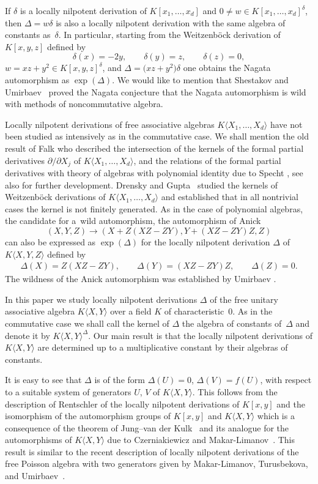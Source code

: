 \documentclass[pdftex]{sigma}
\numberwithin{equation}{section}
\begin{document}
If $\delta$ is a locally nilpotent derivation of $K[x_1,\ldots,x_d]$ and $0\not=w\in K[x_1,\ldots,x_d]^{\delta}$, then $\Delta=w\delta$ is also a locally nilpotent derivation with the same algebra of constants as~$\delta$. In particular, starting from the Weitzenb\"ock derivation of $K[x,y,z]$ defined by
\[
\delta(x)=-2y,\qquad \delta(y)=z,\qquad \delta(z)=0,
\]
$w=xz+y^2\in K[x,y,z]^{\delta}$, and $\Delta=\big(xz+y^2\big)\delta$ one obtains the Nagata automorphism as $\exp(\Delta)$. We would like to mention that Shestakov and Umirbaev~\cite{SU1, SU2} proved the Nagata conjecture that the Nagata automorphism is wild with methods of noncommutative algebra.

Locally nilpotent derivations of free associative algebras $K\langle X_1,\ldots,X_d\rangle$ have not been studied as intensively as in the commutative case. We shall mention the old result of Falk \cite{Fa} who described the intersection of the kernels of the formal partial derivatives $\partial/\partial X_j$ of $K\langle X_1,\ldots,X_d\rangle$, and the relations of the formal partial derivatives with theory of algebras with polynomial identity due to Specht \cite{Sp}, see also \cite{D1} for further development. Drensky and Gupta~\cite{DG} studied the kernels of Weitzenb\"ock derivations of $K\langle X_1,\ldots,X_d\rangle$ and established that in all nontrivial cases the kernel is not finitely generated. As in the case of polynomial algebras, the candidate for a~wild automorphism, the automorphism of Anick \cite[p.~343]{Co}
\[
(X,Y,Z)\to(X+Z(XZ-ZY),Y+(XZ-ZY)Z,Z)
\]
can also be expressed as $\exp(\Delta)$ for the locally nilpotent derivation $\Delta$ of $K\langle X,Y,Z\rangle$ defined by
\begin{gather*}%
\Delta(X)=Z(XZ-ZY),\qquad\Delta(Y)=(XZ-ZY)Z,\qquad\Delta(Z)=0.
\end{gather*}
The wildness of the Anick automorphism was established by Umirbaev \cite{U}.

In this paper we study locally nilpotent derivations $\Delta$ of the free unitary associative algebra $K\langle X,Y\rangle$ over a field $K$ of characteristic~0. As in the commutative case we shall call the kernel of $\Delta$ the algebra of constants of~$\Delta$ and denote it by $K\langle X,Y\rangle^{\Delta}$. Our main result is that the locally nilpotent derivations of $K\langle X,Y\rangle$ are determined up to a multiplicative constant by their algebras of constants.

It is easy to see that $\Delta$ is of the form $\Delta(U)=0$, $\Delta(V)=f(U)$, with respect to a suitable system of generators $U$, $V$ of $K\langle X,Y\rangle$. This follows from the description of Rentschler \cite{R} of the locally nilpotent derivations of $K[x,y]$ and the isomorphism of the automorphism groups of $K[x,y]$ and $K\langle X,Y\rangle$ which is a consequence of the theorem of Jung--van der Kulk~\cite{J, K} and its analogue for the automorphisms of $K\langle X,Y\rangle$ due to Czerniakiewicz \cite{Cz1, Cz2} and Makar-Limanov~\cite{ML}. This result is similar to the recent description of locally nilpotent derivations of the free Poisson algebra with two generators given by Makar-Limanov, Turusbekova, and Umirbaev~\cite{MLTU}.
\end{document}

